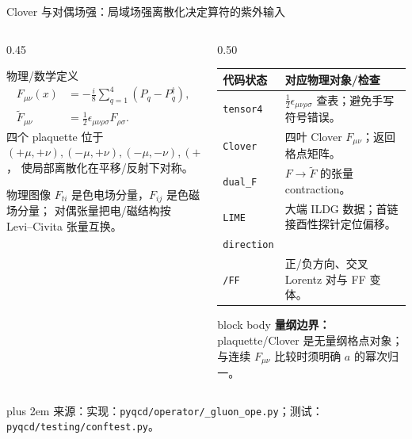 \documentclass[UTF8,aspectratio=169,11pt]{ctexbeamer}
\newcommand{\source}[1]{%
  \par\vspace{0.02em}\begingroup\fontsize{6}{6.8}\selectfont\raggedright\sloppy
  \setlength{\emergencystretch}{3em}\rightskip=0pt plus 2em
  \color{muted}来源：#1\par\endgroup}
\begin{document}
\begin{frame}[t]{Clover 与对偶场强：局域场强离散化决定算符的紫外输入}
  \small
  \begin{columns}[T,totalwidth=\textwidth]
    \begin{column}{0.45\textwidth}
      \begin{block}{物理/数学定义}
        \begin{equation*}
          \begin{aligned}
            F_{\mu\nu}(x)&=-\frac{i}{8}\sum_{q=1}^{4}
            \left(P_q-P_q^\dagger\right),\\[-0.2em]
            \widetilde F_{\mu\nu}&=\frac12\epsilon_{\mu\nu\rho\sigma}F_{\rho\sigma}.
          \end{aligned}
        \end{equation*}
        四个 plaquette 位于 \((+\mu,+\nu),(-\mu,+\nu),(-\mu,-\nu),(+\mu,-\nu)\)，
        使局部离散化在平移/反射下对称。
      \end{block}
      \begin{block}{物理图像}
        \(F_{ti}\) 是色电场分量，\(F_{ij}\) 是色磁场分量；
        对偶张量把电/磁结构按 Levi--Civita 张量互换。
      \end{block}
    \end{column}
    \begin{column}{0.50\textwidth}
      \footnotesize
      \begin{tabular}{@{}p{1.8cm}p{5.1cm}@{}}
        \toprule
        代码状态 & 对应物理对象/检查\\
        \midrule
        \texttt{tensor4} & \(\frac12\epsilon_{\mu\nu\rho\sigma}\) 查表；避免手写符号错误。\\
        \texttt{Clover} & 四叶 Clover \(F_{\mu\nu}\)；返回格点矩阵。\\
        \texttt{dual\_F} & \(F\to\widetilde F\) 的张量 contraction。\\
        \texttt{LIME} & 大端 ILDG 数据；首链接酉性探针定位偏移。\\
        \texttt{direction}\\[-0.2em]\texttt{/FF} & 正/负方向、交叉 Lorentz 对与 FF 变体。\\
        \bottomrule
      \end{tabular}
      \vfill
      \begin{beamercolorbox}[wd=0.98\linewidth,sep=0.5em,rounded=true]{block body}
        \textbf{量纲边界：}plaquette/Clover 是无量纲格点对象；与连续 \(F_{\mu\nu}\) 比较时须明确 \(a\) 的幂次归一。
      \end{beamercolorbox}
    \end{column}
  \end{columns}
  \source{实现：\nolinkurl{pyqcd/operator/_gluon_ope.py}；测试：\nolinkurl{pyqcd/testing/conftest.py}。}
\end{frame}
\end{document}
